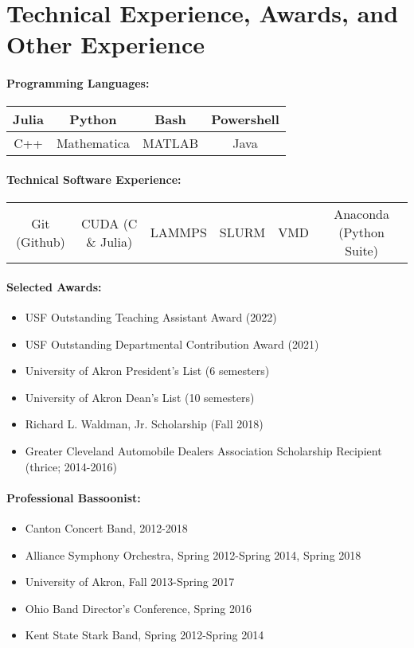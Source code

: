 \documentclass{my_cv}
\begin{document}
\section{Technical Experience, Awards, and Other Experience}

\paragraph{Programming Languages:}
\begin{center}
\begin{tabular}{c|c|c|c}
    Julia & Python & Bash & Powershell \\
    \hline
    C++ & Mathematica & MATLAB & Java \\
\end{tabular}
\end{center}

\paragraph{Technical Software Experience:}
\begin{center}
\begin{tabular}{c|c|c|c|c|c}
   Git (Github) & CUDA (C \& Julia) & LAMMPS & SLURM & VMD & Anaconda (Python Suite) \\
\end{tabular}
\end{center}

\paragraph{Selected Awards:}
\begin{itemize}
    \item USF Outstanding Teaching Assistant Award (2022)
    \item USF Outstanding Departmental Contribution Award (2021)
    \item University of Akron President's List (6 semesters)
    \item University of Akron Dean's List (10 semesters)
    \item Richard L. Waldman, Jr. Scholarship (Fall 2018)
    \item Greater Cleveland Automobile Dealers Association Scholarship Recipient (thrice; 2014-2016)
\end{itemize}

\paragraph{Professional Bassoonist:}
\begin{itemize}
	\item Canton Concert Band, 2012-2018
	\item Alliance Symphony Orchestra, Spring 2012-Spring 2014, Spring 2018
    \item University of Akron, Fall 2013-Spring 2017
	\item Ohio Band Director’s Conference, Spring 2016
	\item Kent State Stark Band, Spring 2012-Spring 2014
\end{itemize}
\end{document}

